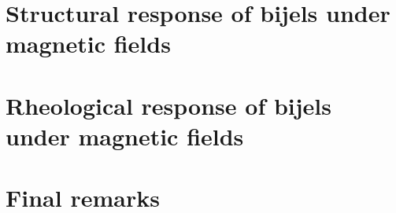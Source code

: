 \documentclass{udthesis}
\begin{document}
\chapter{Structural response of bijels under magnetic fields}
\label{chapter:aim2}


\chapter{Rheological response of bijels under magnetic fields}
\label{chapter:aim3}


\chapter{Final remarks}
\label{chapter:final_remarks}



% 




\end{document}
